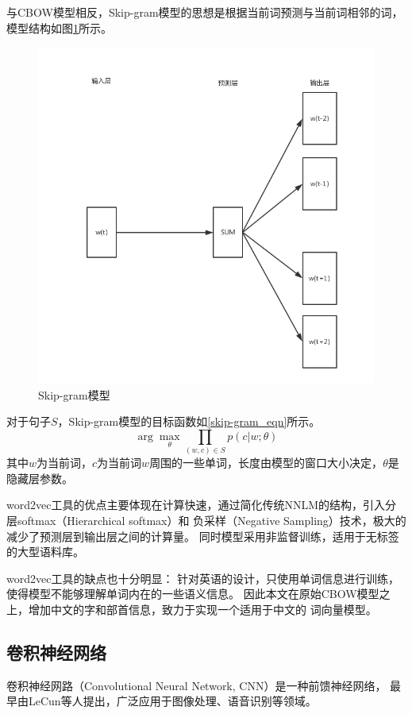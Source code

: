 与CBOW模型相反，Skip-gram模型的思想是根据当前词预测与当前词相邻的词，模型结构如图\ref{skip-gram}所示。
\begin{figure}[h]
    \includegraphics[scale=0.6]{picture/skip-gram.png}
    \caption{Skip-gram模型}
    \label{skip-gram}
\end{figure}
对于句子$S$，Skip-gram模型的目标函数如\ref{skip-gram_eqn}所示。
\begin{equation}
    \arg \max_{\theta } \prod_{\left ( w,c \right )\in S}p\left ( c|w;\theta \right )
    \label{skip-gram_eqn}
\end{equation}
其中$w$为当前词，$c$为当前词$w$周围的一些单词，长度由模型的窗口大小决定，$\theta$是隐藏层参数。

word2vec工具的优点主要体现在计算快速，通过简化传统NNLM的结构，引入分层softmax（Hierarchical softmax）和
负采样（Negative Sampling）技术，极大的减少了预测层到输出层之间的计算量。
同时模型采用非监督训练，适用于无标签的大型语料库。

word2vec工具的缺点也十分明显：
针对英语的设计，只使用单词信息进行训练，使得模型不能够理解单词内在的一些语义信息。
因此本文在原始CBOW模型之上，增加中文的字和部首信息，致力于实现一个适用于中文的
词向量模型。
\subsection{卷积神经网络}
卷积神经网路（Convolutional Neural Network, CNN）是一种前馈神经网络，
最早由LeCun等人提出，广泛应用于图像处理、语音识别等领域。

